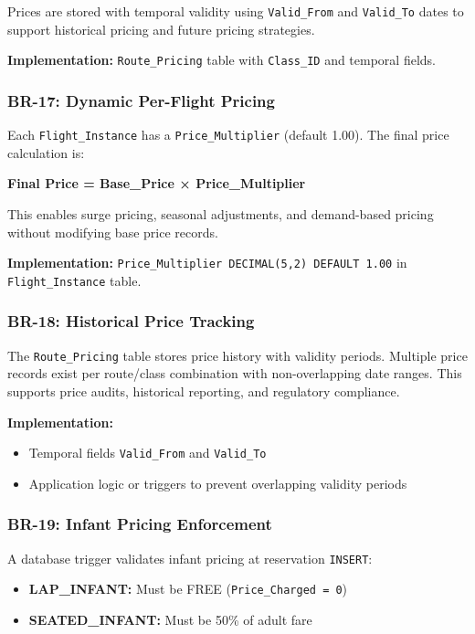 \documentclass[12pt,a4paper,openany]{report}
\begin{document}
Prices are stored with temporal validity using \texttt{Valid\_From} and \texttt{Valid\_To} dates to support historical pricing and future pricing strategies.

\textbf{Implementation:} \texttt{Route\_Pricing} table with \texttt{Class\_ID} and temporal fields.

\subsubsection{BR-17: Dynamic Per-Flight Pricing}
Each \texttt{Flight\_Instance} has a \texttt{Price\_Multiplier} (default 1.00). The final price calculation is:

\textbf{Final Price = Base\_Price × Price\_Multiplier}

This enables surge pricing, seasonal adjustments, and demand-based pricing without modifying base price records.

\textbf{Implementation:} \texttt{Price\_Multiplier DECIMAL(5,2) DEFAULT 1.00} in \texttt{Flight\_Instance} table.

\subsubsection{BR-18: Historical Price Tracking}
The \texttt{Route\_Pricing} table stores price history with validity periods. Multiple price records exist per route/class combination with non-overlapping date ranges. This supports price audits, historical reporting, and regulatory compliance.

\textbf{Implementation:} 
\begin{itemize}
    \item Temporal fields \texttt{Valid\_From} and \texttt{Valid\_To}
    \item Application logic or triggers to prevent overlapping validity periods
\end{itemize}

\subsubsection{BR-19: Infant Pricing Enforcement}
A database trigger validates infant pricing at reservation \texttt{INSERT}:
\begin{itemize}
    \item \textbf{LAP\_INFANT:} Must be FREE (\texttt{Price\_Charged = 0})
    \item \textbf{SEATED\_INFANT:} Must be 50\% of adult fare
\end{itemize}
\end{document}
